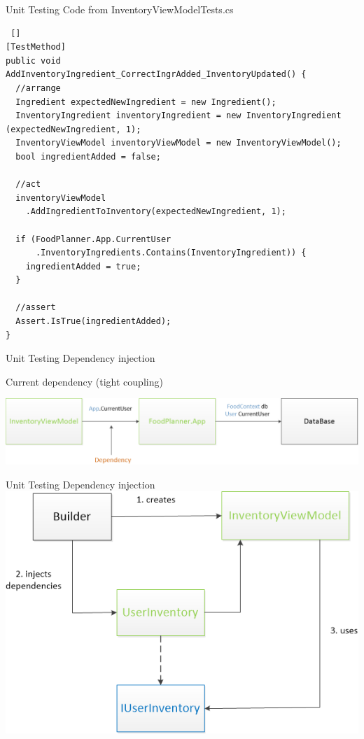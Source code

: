 \begin{frame} [fragile] {Unit Testing} {Code from InventoryViewModelTests.cs}

\begin{lstlisting} []
[TestMethod]
public void
AddInventoryIngredient_CorrectIngrAdded_InventoryUpdated() {
  //arrange
  Ingredient expectedNewIngredient = new Ingredient();
  InventoryIngredient inventoryIngredient = new InventoryIngredient (expectedNewIngredient, 1);
  InventoryViewModel inventoryViewModel = new InventoryViewModel();
  bool ingredientAdded = false;
  
  //act
  inventoryViewModel
    .AddIngredientToInventory(expectedNewIngredient, 1);
  
  if (FoodPlanner.App.CurrentUser
      .InventoryIngredients.Contains(InventoryIngredient)) {
    ingredientAdded = true;
  }
    
  //assert
  Assert.IsTrue(ingredientAdded);
}
\end{lstlisting}

\end{frame}

\begin{frame} {Unit Testing} {Dependency injection}

Current dependency (tight coupling) \newline

\includegraphics[width = \textwidth] {graphics/currentDependency.png}
\end{frame}

\begin{frame} {Unit Testing} {Dependency injection}
\includegraphics[width = \textwidth]{graphics/dependencyInjectionBasic.png}
\end{frame}


